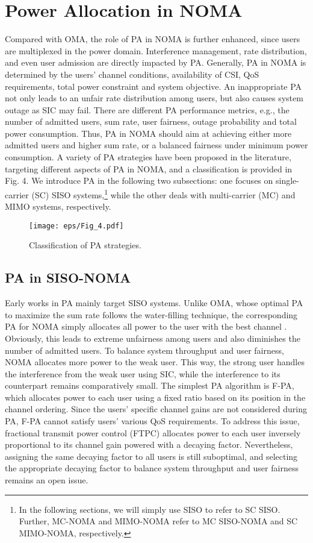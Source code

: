 \documentclass[10pt,final,journal,a4paper,twoside,twocolumn,romanappendices]{IEEEtran}
\theoremstyle{myremark}
\theoremstyle{myremark}
\begin{document}
\section{Power Allocation in NOMA}
Compared with OMA, the role of PA in NOMA is further enhanced,
since users are multiplexed in the power domain. Interference management, rate distribution,
and even user admission are directly impacted by PA. Generally, PA in NOMA is determined
by the users' channel conditions, availability of CSI, QoS requirements, total power constraint and system objective.
An inappropriate PA not only leads to an unfair rate distribution among users, but also causes
system outage as SIC may fail. There are different PA performance metrics, e.g., the number
of admitted users, sum rate, user fairness, outage probability and total power consumption. Thus, PA in NOMA
should aim at achieving either more admitted users and higher sum rate, or a balanced fairness
under minimum power consumption. A variety of PA strategies have been proposed in the literature, targeting
different aspects of PA in NOMA, and a classification is provided in Fig. 4. We introduce PA in the following two subsections: one focuses on single-carrier (SC) SISO  systems,\footnote[3]{In the following sections, we will simply use SISO to refer to SC SISO. Further, MC-NOMA and MIMO-NOMA refer to MC SISO-NOMA and SC MIMO-NOMA, respectively.} while the other deals with
multi-carrier (MC) and MIMO systems, respectively.

\begin{figure}
\centering
\texttt{[image: eps/Fig\_4.pdf]}
\caption{Classification of PA strategies. }
\end{figure} 

\subsection{PA in SISO-NOMA}
Early works in PA mainly target SISO systems. Unlike OMA, whose optimal PA to maximize
the sum rate follows the water-filling technique, the corresponding PA for NOMA simply allocates
all power to the user with the best channel \cite{31, EE}. Obviously, this leads to extreme unfairness among
users and also diminishes the number of admitted users. To balance system throughput and user
fairness, NOMA allocates more power to the weak user. This way, the strong user handles the interference from the weak user using SIC, while the interference to its counterpart remains
comparatively small. {\color{black}The simplest PA algorithm is F-PA, which allocates power to each user using a fixed ratio based on its position in the channel ordering. Since the users' specific channel gains are not considered during PA, F-PA cannot satisfy users' various QoS requirements. To address this issue,} fractional transmit power control (FTPC) allocates power to each user inversely proportional to its channel gain powered with a decaying factor. {\color{black}Nevertheless,} assigning the same decaying factor to all users is still suboptimal, and selecting the appropriate decaying factor to balance system throughput and user fairness remains an open issue. 
\end{document}
